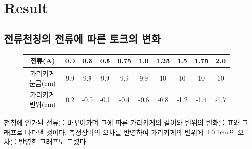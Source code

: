 \documentclass[a4paper]{article}
\newcommand{\mypm}{\mathbin{\smash{%
\raisebox{0.35ex}{%
            $\underset{\raisebox{0.5ex}{$\smash -$}}{\smash+}$%
            }%
        }%
    }%
}
\begin{document}
	\newpage

	\section{Result}

		\subsection{전류천칭의 전류에 따른 토크의 변화}

		\begin{figure}[h]
			\centering
			\begin{tabular}{cccccccccc} 
				\hline \hline
				전류(\si{A})   \qquad \qquad \vline & 0.0 & 0.3 & 0.5 & 0.75 & 1.0 & 1.25 & 1.5 & 1.75 & 2.0 \\
				\hline
				가리키게 눈금(\si{cm}) \vline & 9.9 & 9.9 & 9.9 & 9.9 & 9.9 & 10 & 10 & 10 & 10 \\
				\hline
				가리키게 변위(\si{cm}) \vline & 0.2 & -0.0 & -0.1 & -0.4 & -0.6 & -0.8 & -1.2 & -1.4 & -1.7 \\
				\hline \hline
			\end{tabular}  
			\label{tb:cirouput}
		\end{figure}

		\vspace{-0.5cm}

		\begin{figure}[h]
			\centering
		\end{figure}
		천칭에 인가된 전류를 바꾸어가며 그에 따른 가리키게의 길이와 변위의 변화를 표와 그래프로 나타낸 것이다.
		측정장비의 오차를 반영하여 가리키게의 변위에 $\mypm{}0.1\si{cm}$의 오차를 반영한 그래프도 그렸다. 
\end{document}
